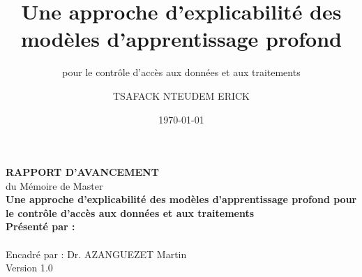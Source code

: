 \documentclass{beamer}
\title{Une approche d'explicabilité des modèles d'apprentissage profond}
\subtitle{pour le contrôle d'accès aux données et aux traitements}
\author{TSAFACK NTEUDEM ERICK}
\date{\today}
\begin{document}
\begin{frame}
\begin{center}
    \vspace{0.5cm}
    
    
    {\LARGE \textcolor{titleblue}{\textbf{RAPPORT D'AVANCEMENT}}} \\[0.2cm]
    {\large du Mémoire de Master} \\[0.2cm]
    
    {\Huge \textbf{Une approche d'explicabilité des modèles d'apprentissage profond pour le contrôle d'accès aux données et aux traitements}} \\[0.2cm]
    
    {\Large \textbf{Présenté par :}} \\[0.3cm]
    {\Large \insertauthor} \\[1cm]
    
    {\large Encadré par : Dr. AZANGUEZET Martin} \\[1.2cm]
    
    {\large \insertdate \quad\quad Version 1.0}
    
\end{center}
\end{frame}
\end{document}
